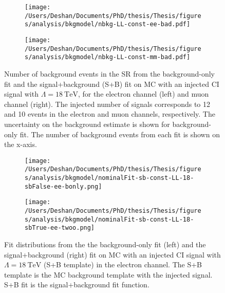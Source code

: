 \begin{figure}[h!]
    \centering
    \begin{subfigure}[b]{0.49\textwidth}
        \centering
        \texttt{[image: /Users/Deshan/Documents/PhD/thesis/Thesis/figures/analysis/bkgmodel/nbkg-LL-const-ee-bad.pdf]}
        \label{fig:bkgmodel:fitsbplusb1bad}
    \end{subfigure}
    \begin{subfigure}[b]{0.49\textwidth}
        \centering
        \texttt{[image: /Users/Deshan/Documents/PhD/thesis/Thesis/figures/analysis/bkgmodel/nbkg-LL-const-mm-bad.pdf]}
        \label{fig:bkgmodel:fitsbplusb2bad}
    \end{subfigure}
    \caption[Background estimation comparisons of the signal+background fit and background only fit in an invalid CR choice.]{Number of background events in the SR from the background-only fit and the signal+background (S+B) fit on MC with an injected CI signal with $\Lambda = \SI{18}{\tera\electronvolt}$, for the electron channel (left) and muon channel (right). The injected number of signals corresponds to 12 and 10 events in the electron and muon channels, respectively. The uncertainty on the background estimate is shown for background-only fit. The number of background events from each fit is shown on the x-axis.}
    \label{fig:bkgmodel:fitsbplusbbad}
\end{figure}

\begin{figure}[h!]
    \centering
    \begin{subfigure}[b]{0.49\textwidth}
        \centering
        \texttt{[image: /Users/Deshan/Documents/PhD/thesis/Thesis/figures/analysis/bkgmodel/nominalFit-sb-const-LL-18-sbFalse-ee-bonly.png]}
        \label{fig:bkgmodel:fitsbplusb1baddist}
    \end{subfigure}
    \begin{subfigure}[b]{0.49\textwidth}
        \centering
        \texttt{[image: /Users/Deshan/Documents/PhD/thesis/Thesis/figures/analysis/bkgmodel/nominalFit-sb-const-LL-18-sbTrue-ee-twoo.png]}
        \label{fig:bkgmodel:fitsbplusb2baddist}
    \end{subfigure}
    \caption[Background estimation distribution comparisons of the signal+background fit and background only fit in an invalid CR choice.]{Fit distributions from the the background-only fit (left) and the signal+background (right) fit on MC with an injected CI signal with $\Lambda = \SI{18}{\tera\electronvolt}$ (S+B template) in the electron channel. The S+B template is the MC background template with the injected signal. S+B fit is the signal+background fit function.}
    \label{fig:bkgmodel:fitsbplusbbaddist}
\end{figure}